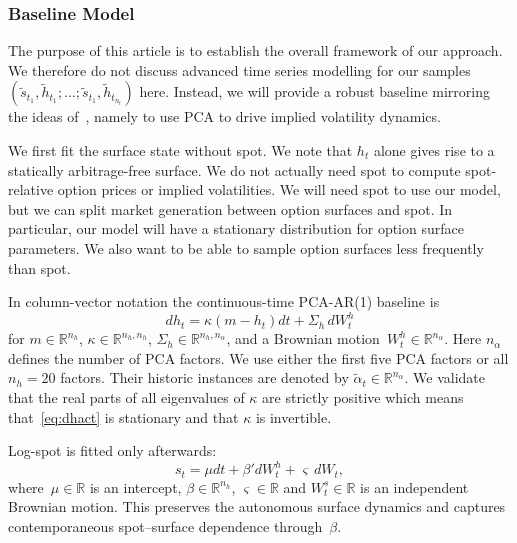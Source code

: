\documentclass[11pt,a4paper]{article}
\newcommand{\R}{\mathbb{R}}
\begin{document}
\subsubsection*{Baseline Model}

The purpose of this article is to establish the overall framework of our approach. We therefore
do not discuss advanced time series modelling for our samples $(\tilde s_{t_1},\tilde h_{t_1};\ldots;\tilde s_{t_1},\tilde h_{t_{n_t}})$ here. Instead, we will
provide a robust baseline mirroring the ideas of~\cite{ContVol}, namely to use
PCA to drive implied volatility dynamics. 

We first fit the surface state without spot. We note that $h_t$ alone gives rise to a statically arbitrage-free
surface. We do not actually need spot to compute spot-relative option prices or implied volatilities. We will
need spot to use our model, but we can split market generation between option surfaces and spot. In particular,
our model will have a stationary distribution for option surface parameters.
We also want to be able to sample option surfaces less frequently than spot.

In column-vector notation the
continuous-time PCA-AR(1) baseline is
\begin{equation}\label{eq:dhact}
    dh_t=\kappa (m-h_t)dt+\Sigma_h\,dW_t^h
\end{equation}
for $m\in \R^{n_h}$, $\kappa \in \R^{n_h,n_h}$, $\Sigma_h\in\R^{n_h,n_\alpha}$, and a Brownian motion~$W_t^h\in\R^{n_\alpha}$.
Here $n_\alpha$ defines the number of PCA factors. We use either the first five PCA factors
or all $n_h=20$ factors. Their historic instances are denoted by $\tilde \alpha_t \in \R^{n_\alpha}$.
We validate that the real parts of all eigenvalues of $\kappa$ are strictly positive which means that~\eqref{eq:dhact} is stationary
and that $\kappa$ is invertible.



Log-spot is fitted only afterwards:
\begin{equation}\label{eq:spot_conditional}
    s_t=\mu dt+\beta' dW_t^h+\varsigma\,dW_t,
\end{equation}
where~$\mu\in\R$ is an intercept, $\beta\in\R^{n_h}$, $\varsigma\in\R$ and $W^s_t\in\R$ is an independent Brownian motion. This preserves the autonomous surface
dynamics and captures contemporaneous spot--surface dependence through~$\beta$. 
\end{document}
